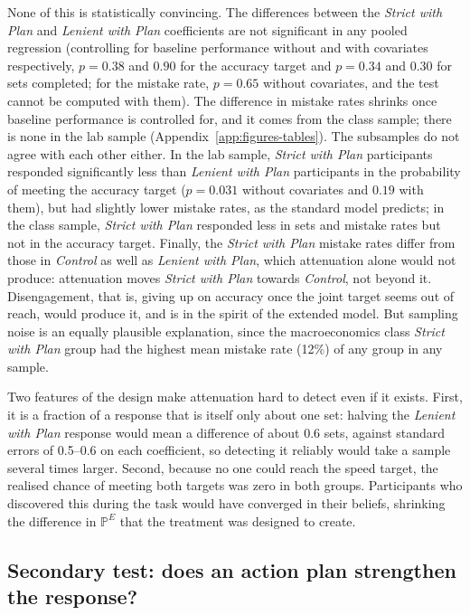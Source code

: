 \documentclass[12pt, letterpaper]{article}
\newcommand{\CtrlName}{Control}
\newcommand{\LPName}{Lenient with Plan}
\newcommand{\SPName}{Strict with Plan}
\newcommand{\Ctrl}{\textit{\CtrlName}}
\newcommand{\LP}{\textit{\LPName}}
\newcommand{\SP}{\textit{\SPName}}
\begin{document}
None of this is statistically convincing. The differences between the \SP{} and \LP{} coefficients are not significant in any pooled regression (controlling for baseline performance without and with covariates respectively, $p = 0.38$ and $0.90$ for the accuracy target and $p = 0.34$ and $0.30$ for sets completed; for the mistake rate, $p = 0.65$ without covariates, and the test cannot be computed with them). The difference in mistake rates shrinks once baseline performance is controlled for, and it comes from the class sample; there is none in the lab sample (Appendix~\ref{app:figures-tables}). The subsamples do not agree with each other either. In the lab sample, \SP{} participants responded significantly less than \LP{} participants in the probability of meeting the accuracy target ($p = 0.031$ without covariates and $0.19$ with them), but had slightly lower mistake rates, as the standard model predicts; in the class sample, \SP{} responded less in sets and mistake rates but not in the accuracy target. Finally, the \SP{} mistake rates differ from those in \Ctrl{} as well as \LP{}, which attenuation alone would not produce: attenuation moves \SP{} towards \Ctrl{}, not beyond it. Disengagement, that is, giving up on accuracy once the joint target seems out of reach, would produce it, and is in the spirit of the extended model. But sampling noise is an equally plausible explanation, since the macroeconomics class \SP{} group had the highest mean mistake rate (12\%) of any group in any sample.

Two features of the design make attenuation hard to detect even if it exists. First, it is a fraction of a response that is itself only about one set: halving the \LP{} response would mean a difference of about 0.6 sets, against standard errors of 0.5--0.6 on each coefficient, so detecting it reliably would take a sample several times larger. Second, because no one could reach the speed target, the realised chance of meeting both targets was zero in both groups. Participants who discovered this during the task would have converged in their beliefs, shrinking the difference in $\mathbb{P}^E$ that the treatment was designed to create.

\subsection{Secondary test: does an action plan strengthen the response?}
\end{document}
